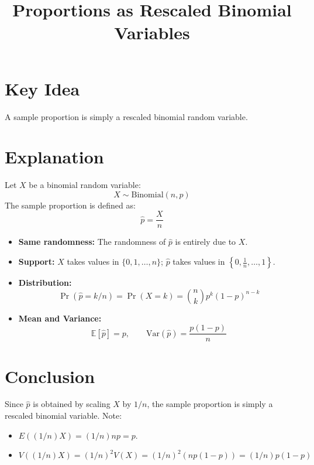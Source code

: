 \documentclass{article}
\begin{document}
\title{Proportions as Rescaled Binomial Variables}
\author{}
\date{}
\maketitle

\section*{Key Idea}

A sample proportion is simply a rescaled binomial random variable.

\section*{Explanation}

Let $X$ be a binomial random variable:
\[
X \sim \text{Binomial}(n, p)
\]
The sample proportion is defined as:
\[
\hat{p} = \frac{X}{n}
\]

\begin{itemize}
    \item \textbf{Same randomness:} The randomness of $\hat{p}$ is entirely due to $X$.
    \item \textbf{Support:} $X$ takes values in $\{0, 1, \dots, n\}$; $\hat{p}$ takes values in $\left\{0, \frac{1}{n}, \dots, 1\right\}$.
    \item \textbf{Distribution:}
\[
    \Pr(\hat{p} = k/n) = \Pr(X = k) = \binom{n}{k} p^k (1-p)^{n-k}
\]
    \item \textbf{Mean and Variance:}
\[
    \mathbb{E}[\hat{p}] = p, \qquad \text{Var}(\hat{p}) = \frac{p(1-p)}{n}
\]
\end{itemize}

\section*{Conclusion}

Since $\hat{p}$ is obtained by scaling $X$ by $1/n$, the sample proportion is simply a rescaled binomial variable. Note: 
\begin{itemize}
    \item $E((1/n)X)=(1/n) np=p$.
    \item $V((1/n)X)=(1/n)^2 V(X) = (1/n)^2 (np(1-p))=(1/n)p(1-p)$
\end{itemize}
\end{document}
